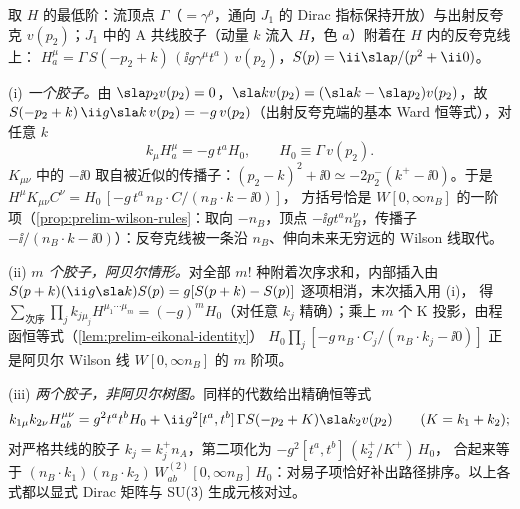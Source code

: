\begin{example}\label{ex:sudakov-ward-wilson}
取 $H$ 的最低阶：流顶点 $\Gamma$（$=\gamma^\rho$，通向 $J_1$ 的 Dirac 指标保持开放）与出射反夸克 $v(p_2)$；$J_1$ 中的 A 共线胶子（动量 $k$ 流入 $H$，色 $a$）附着在 $H$ 内的反夸克线上：
$H^\mu_a=\Gamma\,S(-p_2+k)\,(\ii g\gamma^\mu t^a)\,v(p_2)$，$S(p)=\ii\sla p/(p^2+\ii0)$。

(i) \emph{一个胶子。}由 $\sla p_2v(p_2)=0$，$\sla kv(p_2)=(\sla k-\sla p_2)v(p_2)$，故 $S(-p_2+k)\,\ii g\sla k\,v(p_2)=-g\,v(p_2)$（出射反夸克端的基本 Ward 恒等式），对任意 $k$
\begin{equation}\label{eq:sudakov-ward1}
k_\mu H^\mu_a=-g\,t^a H_0,\qquad H_0\equiv\Gamma\,v(p_2).
\end{equation}
$K_{\mu\nu}$ 中的 $-\ii0$ 取自被近似的传播子：$(p_2-k)^2+\ii0\simeq-2p_2^-(k^+-\ii0)$。于是 $H^\mu K_{\mu\nu}C^\nu=H_0\,[-g\,t^a\,n_B\!\cdot\!C/(n_B\cdot k-\ii0)]$，
方括号恰是 $W[0,\infty n_B]$ 的一阶项（\cref{prop:prelim-wilson-rules}：取向 $-n_B$，顶点 $-\ii gt^an_B^\nu$，传播子 $-\ii/(n_B\cdot k-\ii0)$）：反夸克线被一条沿 $n_B$、伸向未来无穷远的 Wilson 线取代。

(ii) \emph{$m$ 个胶子，阿贝尔情形。}对全部 $m!$ 种附着次序求和，内部插入由 $S(p+k)(\ii g\sla k)S(p)=g[S(p+k)-S(p)]$ 逐项相消，末次插入用 (i)，
得 $\sum_{\text{次序}}\prod_jk_{j\mu_j}H^{\mu_1\cdots\mu_m}=(-g)^mH_0$（对任意 $k_j$ 精确）；乘上 $m$ 个 K 投影，由程函恒等式（\cref{lem:prelim-eikonal-identity}）
$H_0\prod_j[-g\,n_B\cdot C_j/(n_B\cdot k_j-\ii0)]$ 正是阿贝尔 Wilson 线 $W[0,\infty n_B]$ 的 $m$ 阶项。

(iii) \emph{两个胶子，非阿贝尔树图。}同样的代数给出精确恒等式
\[
k_{1\mu}k_{2\nu}H^{\mu\nu}_{ab}=g^2t^at^bH_0+\ii g^2[t^a,t^b]\,\Gamma S(-p_2+K)\sla k_2v(p_2)\qquad(K=k_1+k_2);
\]
对严格共线的胶子 $k_j=k_j^+n_A$，第二项化为 $-g^2[t^a,t^b]\,(k_2^+/K^+)\,H_0$，
合起来等于 $(n_B\!\cdot\!k_1)(n_B\!\cdot\!k_2)\,W^{(2)}_{ab}[0,\infty n_B]\,H_0$：对易子项恰好补出路径排序。以上各式都以显式 Dirac 矩阵与 SU(3) 生成元核对过。%
\end{example}


